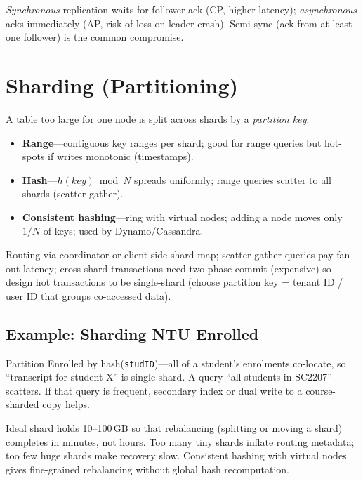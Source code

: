 \emph{Synchronous} replication waits for follower ack (CP, higher latency); \emph{asynchronous} acks immediately (AP, risk of loss on leader crash). Semi-sync (ack from at least one follower) is the common compromise.

\section{Sharding (Partitioning)}
\label{sec:sharding}

A table too large for one node is split across shards by a \emph{partition key}:

\begin{itemize}
    \item \textbf{Range}---contiguous key ranges per shard; good for range queries but hot-spots if writes monotonic (timestamps).
    \item \textbf{Hash}---$h(key)\bmod N$ spreads uniformly; range queries scatter to all shards (scatter-gather).
    \item \textbf{Consistent hashing}---ring with virtual nodes; adding a node moves only $1/N$ of keys; used by Dynamo/Cassandra.
\end{itemize}

Routing via coordinator or client-side shard map; scatter-gather queries pay fan-out latency; cross-shard transactions need two-phase commit (expensive) so design hot transactions to be single-shard (choose partition key = tenant ID / user ID that groups co-accessed data).

\subsection{Example: Sharding NTU Enrolled}

Partition Enrolled by hash(\texttt{studID})---all of a student's enrolments co-locate, so ``transcript for student X'' is single-shard. A query ``all students in SC2207'' scatters. If that query is frequent, secondary index or dual write to a course-sharded copy helps.

\begin{remark}
Ideal shard holds 10--100\,GB so that rebalancing (splitting or moving a shard) completes in minutes, not hours. Too many tiny shards inflate routing metadata; too few huge shards make recovery slow. Consistent hashing with virtual nodes gives fine-grained rebalancing without global hash recomputation.
\end{remark}

